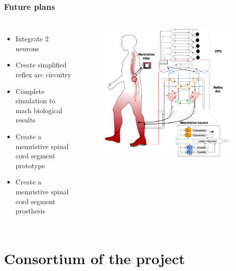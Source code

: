 \documentclass[12pt, aspectratio=169]{beamer}
\begin{document}
\begin{frame}
  \frametitle{Future plans}
\begin{columns}[c]

\begin{itemize}
\item Integrate 2 neurons
\item Create simplified reflex arc circuitry
\item Complete simulation to mach biological results
\item Create a memristive spinal cord segment prototype
\item Create a memristive spinal cord segment prosthesis
\end{itemize}
\begin{figure}
\includegraphics[width=1.0\linewidth]{MemArc_logo}
\end{figure}
\end{columns}
\end{frame}

\section{Consortium of the project}
\end{document}

